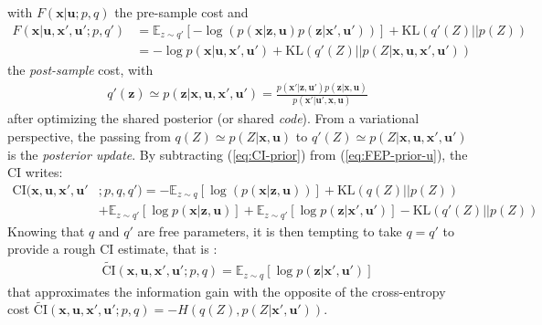 \documentclass{article}
\begin{document}
with $F(\boldsymbol{x}|\boldsymbol{u};p,q)$ the pre-sample cost and  
\begin{align}
F(\boldsymbol{x}|\boldsymbol{u}, \boldsymbol{x}', \boldsymbol{u}';p,q') &= 
\mathbb{E}_{z\sim q'} \left[-\log (p(\boldsymbol{x}|\boldsymbol{z}, \boldsymbol{u}) p(\boldsymbol{z}|\boldsymbol{x}', \boldsymbol{u}'))\right] +\text{KL}(q'(Z)||p(Z))\label{eq:CI-prior}\\
&= -\log p(\boldsymbol{x}| \boldsymbol{u}, \boldsymbol{x}', \boldsymbol{u}') + \text{KL}(q'(Z)||p(Z|\boldsymbol{x}, \boldsymbol{u}, \boldsymbol{x}', \boldsymbol{u}'))\label{eq:CI-post}
\end{align}
the \emph{post-sample} cost, with 
\begin{align}
q'(\boldsymbol{z}) \simeq p(\boldsymbol{z}|\boldsymbol{x}, \boldsymbol{u}, \boldsymbol{x}', \boldsymbol{u}') = \frac{p(\boldsymbol{x}'|\boldsymbol{z}, \boldsymbol{u}')p(\boldsymbol{z}|\boldsymbol{x}, \boldsymbol{u})}{p(\boldsymbol{x}'|\boldsymbol{u}',\boldsymbol{x},\boldsymbol{u})}
\end{align} 
after optimizing the shared posterior (or shared \emph{code}). From a variational perspective, the passing from $q(Z) \simeq p(Z|\boldsymbol{x}, \boldsymbol{u})$ to $q'(Z) \simeq p(Z|\boldsymbol{x}, \boldsymbol{u}, \boldsymbol{x}', \boldsymbol{u}')$ is the \emph{posterior update}.
By subtracting (\ref{eq:CI-prior}) from (\ref{eq:FEP-prior-u}), the CI writes:
\begin{align}
\text{CI}(\boldsymbol{x},\boldsymbol{u}, \boldsymbol{x}', \boldsymbol{u}'&;p,q,q')=
  - \mathbb{E}_{z\sim q} \left[\log (p(\boldsymbol{x}|\boldsymbol{z},\boldsymbol{u}))\right] +\text{KL}(q(Z)||p(Z))\nonumber\\
& + \mathbb{E}_{z\sim q'} \left[\log p(\boldsymbol{x}|\boldsymbol{z}, \boldsymbol{u})\right] 
+ \mathbb{E}_{z\sim q'} \left[\log p(\boldsymbol{z}|\boldsymbol{x}', \boldsymbol{u}')\right] -\text{KL}(q'(Z)||p(Z))\label{eq:CI}
\end{align} 
Knowing that $q$ and $q'$ are free parameters, it is then tempting to take $q=q'$ to provide a rough CI estimate, that is :
\begin{align}
\tilde{\text{CI}}(\boldsymbol{x},\boldsymbol{u}, \boldsymbol{x}', \boldsymbol{u}';p, q) = \mathbb{E}_{z\sim q} \left[\log p(\boldsymbol{z}|\boldsymbol{x}', \boldsymbol{u}')\right]\label{eq:PCI}
\end{align}
that approximates the information gain with the opposite of the cross-entropy cost $\tilde{\text{CI}}(\boldsymbol{x},\boldsymbol{u}, \boldsymbol{x}', \boldsymbol{u}';p, q) = -H(q(Z),p(Z|\boldsymbol{x}', \boldsymbol{u}'))$.
\end{document}
